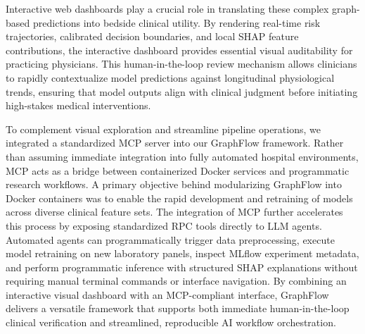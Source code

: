 \documentclass[pdflatex,sn-mathphys-num,lineno]{sn-jnl}
\theoremstyle{thmstyleone}%
\theoremstyle{thmstyletwo}%
\theoremstyle{thmstylethree}%
\begin{document}
Interactive web dashboards play a crucial role in translating these complex graph-based predictions into bedside clinical utility. By rendering real-time risk trajectories, calibrated decision boundaries, and local SHAP feature contributions, the interactive dashboard provides essential visual auditability for practicing physicians. This human-in-the-loop review mechanism allows clinicians to rapidly contextualize model predictions against longitudinal physiological trends, ensuring that model outputs align with clinical judgment before initiating high-stakes medical interventions.

To complement visual exploration and streamline pipeline operations, we integrated a standardized MCP server into our GraphFlow framework. Rather than assuming immediate integration into fully automated hospital environments, MCP acts as a bridge between containerized Docker services and programmatic research workflows. A primary objective behind modularizing GraphFlow into Docker containers was to enable the rapid development and retraining of models across diverse clinical feature sets. The integration of MCP further accelerates this process by exposing standardized RPC tools directly to LLM agents. Automated agents can programmatically trigger data preprocessing, execute model retraining on new laboratory panels, inspect MLflow experiment metadata, and perform programmatic inference with structured SHAP explanations without requiring manual terminal commands or interface navigation. By combining an interactive visual dashboard with an MCP-compliant interface, GraphFlow delivers a versatile framework that supports both immediate human-in-the-loop clinical verification and streamlined, reproducible AI workflow orchestration.
\end{document}
